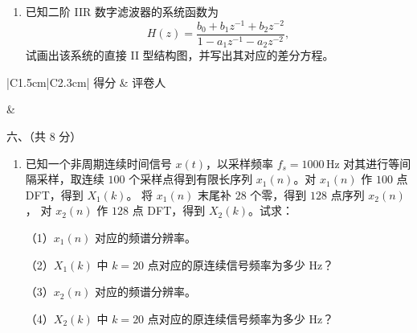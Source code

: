 \documentclass[UTF8,a4paper,12pt]{ctexart}
\begin{document}
\vspace{1.2em}

\begin{enumerate}[label={}, leftmargin=2em, itemsep=1.6em]

\item 已知二阶 IIR 数字滤波器的系统函数为
\[
H(z)
=\frac{b_0+b_1z^{-1}+b_2z^{-2}}
{1-a_1z^{-1}-a_2z^{-2}},
\]
试画出该系统的直接 II 型结构图，并写出其对应的差分方程。
\newpage

\vspace*{3cm}

\end{enumerate}


\noindent
\begin{minipage}[t]{0.25\textwidth}
\renewcommand{\arraystretch}{1.5}
\begin{tabular}{|C{1.5cm}|C{2.3cm}|}
\hline
得分 & 评卷人 \\
\hline
\rule{0pt}{0.8cm}&  \\
\hline
\end{tabular}
\end{minipage}
\begin{minipage}[t]{0.72\textwidth}
\vspace{0.2cm}
\begin{center}
{\heiti 六、（共 8 分）}
\end{center}
\end{minipage}

\vspace{1.2em}

\begin{enumerate}[label={}, leftmargin=2em, itemsep=1.6em]

\item 已知一个非周期连续时间信号 $x(t)$，以采样频率
$f_s=1000\,\mathrm{Hz}$ 对其进行等间隔采样，取连续 $100$ 个采样点得到有限长序列
$x_1(n)$。对 $x_1(n)$ 作 $100$ 点 DFT，得到 $X_1(k)$。
将 $x_1(n)$ 末尾补 $28$ 个零，得到 $128$ 点序列 $x_2(n)$，
对 $x_2(n)$ 作 $128$ 点 DFT，得到 $X_2(k)$。试求：

（1）$x_1(n)$ 对应的频谱分辨率。

（2）$X_1(k)$ 中 $k=20$ 点对应的原连续信号频率为多少 Hz？

（3）$x_2(n)$ 对应的频谱分辨率。

（4）$X_2(k)$ 中 $k=20$ 点对应的原连续信号频率为多少 Hz？

\end{enumerate}

\vspace*{4cm}
\end{document}
